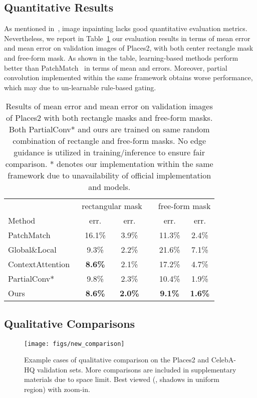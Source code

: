 \documentclass[10pt,twocolumn,letterpaper]{article}
\begin{document}
\subsection{Quantitative Results}
As mentioned in~\cite{yu2018generative}, image inpainting lacks good quantitative evaluation metrics.
Nevertheless, we report in Table~\ref{tabs:quantitative} our evaluation results in terms of mean  error and mean  error on validation images of Places2, with both center rectangle mask and free-form mask.
As shown in the table, learning-based methods perform better than PatchMatch~\cite{barnes2009patchmatch} in terms of mean  and  errors.
Moreover, partial convolution implemented within the same framework obtains worse performance, which may due to un-learnable rule-based gating. \begin{table}[ht]
\centering
\caption{Results of mean  error and mean  error on validation images of Places2 with both rectangle masks and free-form masks. Both PartialConv* and ours are trained on same random combination of rectangle and free-form masks. No edge guidance is utilized in training/inference to ensure fair comparison. * denotes our implementation within the same framework due to unavailability of official implementation and models.}
\small
\begin{tabular}{@{}l c c l c c@{}} \toprule
 & \multicolumn{2}{c}{rectangular mask} && \multicolumn{2}{c}{free-form mask}\\
\cmidrule{2-3} \cmidrule{5-6}
Method &  err. &  err. &&  err. &  err. \\
\midrule
PatchMatch~\cite{barnes2009patchmatch} & 16.1\% & 3.9\% && 11.3\% & 2.4\% \\
Global\&Local~\cite{iizuka2017globally} & 9.3\% & 2.2\% && 21.6\% & 7.1\%\\
ContextAttention~\cite{yu2018generative} & \textbf{8.6\%} & 2.1\% && 17.2\% & 4.7\%\\
PartialConv*~\cite{liu2018image} & 9.8\% & 2.3\% && 10.4\% & 1.9\%\\
Ours & \textbf{8.6\%} & \textbf{2.0\%} && \textbf{9.1\%} & \textbf{1.6\%}\\
\bottomrule
\end{tabular}
\label{tabs:quantitative}
\end{table} 

\subsection{Qualitative Comparisons}
\begin{figure*}[t]
  \centering
  \texttt{[image: figs/new\_comparison]}
  \vspace*{-5mm}
  \caption{Example cases of qualitative comparison on the Places2 and CelebA-HQ validation sets. More comparisons are included in supplementary materials due to space limit. Best viewed (\eg, shadows in uniform region) with zoom-in.}
  \label{figs:comparisons}
\end{figure*}
\end{document}
